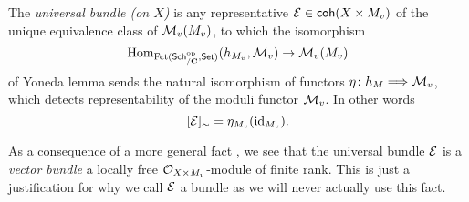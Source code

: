 \begin{definition}
    The \emph{universal bundle (on $X$)} is any representative $\mathcal E \in \mathsf{coh}(X \times M_v)$ of the unique equivalence class of $\mathcal M_v(M_v)$, to which the isomorphism 
    \[
        \mathrm{Hom}_{\operatorname{Fct(\mathsf{Sch}_{/\mathbf C}^{\text{op}}, \mathsf{Set})}}(h_{M_v}, \mathcal M_v) \to \mathcal M_v(M_v)
    \]
    of Yoneda lemma sends the natural isomorphism of functors $\eta \colon h_M \Longrightarrow \mathcal M_v$, which detects representability of the moduli functor $\mathcal M_v$. In other words 
    \[
        [\mathcal E]_\sim = \eta_{M_v}(\operatorname{id}_{{M_v}}).
    \]
\end{definition}

\begin{remark}
    As a consequence of a more general fact \cite[\S 6.1, Remark 6.1.9]{HuybrechtsLehn2010}, we see that the universal bundle $\mathcal E$ is a \emph{vector bundle} \ie a locally free ${\mathcal{O}_{X \times M_v}}$-module of finite rank. This is just a justification for why we call $\mathcal E$ a bundle as we will never actually use this fact. 
\end{remark}


